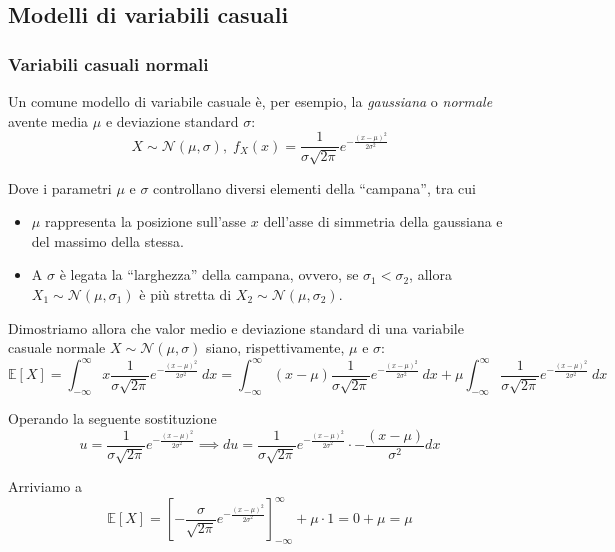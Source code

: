         \subsection{Modelli di variabili casuali}
            \subsubsection{Variabili casuali normali}
                Un comune modello di variabile casuale è, per esempio, la \textit{gaussiana} o \textit{normale} avente media $\mu$ e deviazione standard $\sigma$:
                \[
                    X \sim \mathcal{N}(\mu, \sigma),
                    \; f_{X}(x) = \frac{1}{\sigma \sqrt{2 \pi}} e^{-\frac{(x - \mu)^{2}}{2 \sigma^{2}}}
                \]

                Dove i parametri $\mu$ e $\sigma$ controllano diversi elementi della ``campana'', tra cui
                \begin{itemize}
                    \item $\mu$ rappresenta la posizione sull'asse $x$ dell'asse di simmetria della gaussiana e del massimo della stessa.
                    \item A $\sigma$ è legata la ``larghezza'' della campana, ovvero, se $\sigma_{1} < \sigma_{2}$, allora $X_{1} \sim \mathcal{N}(\mu, \sigma_{1})$ è più stretta di $X_{2} \sim \mathcal{N}(\mu, \sigma_{2})$.
                \end{itemize}

                Dimostriamo allora che valor medio e deviazione standard di una variabile casuale normale $X \sim \mathcal{N}(\mu, \sigma)$ siano, rispettivamente, $\mu$ e $\sigma$:
                \[
                    \mathbb{E}[X] = \int_{-\infty}^{\infty} x \frac{1}{\sigma \sqrt{2 \pi}} e^{- \frac{(x - \mu)^{2}}{2 \sigma^{2}}} \: dx =
                    \int_{-\infty}^{\infty} (x - \mu) \frac{1}{\sigma \sqrt{2 \pi}} e^{- \frac{(x - \mu)^{2}}{2 \sigma^{2}}} \: dx + \mu \int_{-\infty}^{\infty} \frac{1}{\sigma \sqrt{2 \pi}} e^{-\frac{(x - \mu)^{2}}{2 \sigma^{2}}} \: dx
                \]

                Operando la seguente sostituzione
                \[
                    u = \frac{1}{\sigma \sqrt{2 \pi}} e^{-\frac{(x - \mu)^{2}}{2 \sigma^{2}}} \implies du = \frac{1}{\sigma \sqrt{2 \pi}} e^{-\frac{(x - \mu)^{2}}{2 \sigma^{2}}} \cdot - \frac{(x - \mu)}{\sigma^{2}} dx
                \]

                Arriviamo a
                \[
                    \mathbb{E}[X] = \left[- \frac{\sigma}{\sqrt{2 \pi}} e^{-\frac{(x - \mu)^{2}}{2 \sigma^{2}}}\right]^{\infty}_{-\infty} + \mu \cdot 1 = 0 + \mu = \mu
                \]

